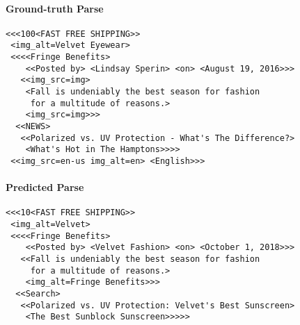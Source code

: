 \documentclass{article} \usepackage[accepted]{icml2023}
\begin{document}
\begin{figure*}
\small
\centering
{}
\begin{tcolorbox}
\paragraph{Ground-truth Parse}
\begin{verbatim}
<<<100<FAST FREE SHIPPING>> 
 <img_alt=Velvet Eyewear> 
 <<<<Fringe Benefits>
    <<Posted by> <Lindsay Sperin> <on> <August 19, 2016>>> 
   <<img_src=img>
    <Fall is undeniably the best season for fashion
     for a multitude of reasons.> 
    <img_src=img>>>
  <<NEWS> 
   <<Polarized vs. UV Protection - What's The Difference?>
    <What's Hot in The Hamptons>>>> 
 <<img_src=en-us img_alt=en> <English>>>
\end{verbatim}
\end{tcolorbox}
\begin{tcolorbox}
\paragraph{Predicted Parse}
\begin{verbatim}
<<<10<FAST FREE SHIPPING>> 
 <img_alt=Velvet>
 <<<<Fringe Benefits>
    <<Posted by> <Velvet Fashion> <on> <October 1, 2018>>>
   <<Fall is undeniably the best season for fashion 
     for a multitude of reasons.> 
    <img_alt=Fringe Benefits>>>
  <<Search> 
   <<Polarized vs. UV Protection: Velvet's Best Sunscreen> 
    <The Best Sunblock Sunscreen>>>>>
\end{verbatim}
\end{tcolorbox}
\end{figure*}
\end{document}

